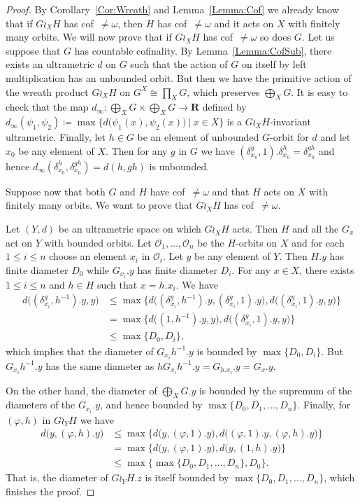 \documentclass[a4paper]{article}
\theoremstyle{definition}
\newcommand*{\field}[1]{\mathbf{#1}}
\newcommand*{\R}{\field{R}}
\newcommand{\setst}[2]{\{#1\ |\ #2\}}
\begin{document}
\begin{proof}
By Corollary~\ref{Cor:Wreath} and Lemma~\ref{Lemma:Cof} we already know that if $G \wr_X H$ has cof~$\neq\omega$, then $H$ has cof~$\neq\omega$ and it acts on $X$ with finitely many orbits.
We will now prove that if $G \wr_X H$ has cof~$\neq\omega$ so does $G$.
Let us suppose that $G$ has countable cofinality. By Lemma~\ref{Lemma:CofSub}, there exists an ultrametric $d$ on $G$ such that the action of $G$ on itself by left multiplication has an unbounded orbit.
But then we have the primitive action of the wreath product $G\wr_XH$ on $G^X\cong\prod_XG$, which preserves $\bigoplus_XG$.
It is easy to check that the map $d_\infty\colon\bigoplus_XG\times\bigoplus_XG\to\R$ defined by $d_\infty(\psi_1,\psi_2)\coloneqq\max\setst{d\bigl(\psi_1(x),\psi_2(x)\bigr)}{x\in X}$ is a $G\wr_XH$-invariant ultrametric.
Finally, let $h\in G$ be an element of unbounded $G$-orbit for $d$ and let $x_0$ be any element of $X$. Then for any $g$ in $G$ we have $(\delta_{x_0}^g,1).\delta_{x_0}^h=\delta_{x_0}^{gh}$ and hence $d_\infty(\delta_{x_0}^h,\delta_{x_0}^{gh})=d(h,gh)$ is unbounded.

Suppose now that both $G$ and $H$ have cof~$\neq\omega$ and that $H$ acts on $X$ with finitely many orbits. We want to prove that $G\wr_XH$ has cof~$\neq\omega$.

Let $(Y,d)$ be an ultrametric space on which $G\wr_XH$ acts.
Then $H$ and all the $G_x$ act on $Y$ with bounded orbits.
Let $\mathcal O_1,\dots,\mathcal O_n$ be the $H$-orbits on $X$ and for each $1\leq i\leq n$ choose an element $x_i$ in $\mathcal O_i$.
Let $y$ be any element of $Y$.
Then $H.y$ has finite diameter $D_0$ while $G_{x_i}.y$ has finite diameter $D_i$.
For any $x\in X$, there exists $1\leq i\leq n$ and $h\in H$ such that $x=h.x_i$.
We have
\begin{align*}
	d\bigl((\delta_{x_i}^g,h^{-1}).y,y\bigr)&\leq\max\{d\bigl((\delta_{x_i}^g,h^{-1}).y,(\delta_{x_i}^g,1).y\bigr),d\bigl((\delta_{x_i}^g,1).y,y\bigr)\}\\
	&=\max\{d\bigl((1,h^{-1}).y,y\bigr),d\bigl((\delta_{x_i}^g,1).y,y\bigr)\}\\
	&\leq \max\{D_0,D_i\},
\end{align*}
which implies that the diameter of $G_{x_i}h^{-1}.y$ is bounded by $\max\{D_0,D_i\}$.
But $G_{x_i}h^{-1}.y$ has the same diameter as $hG_{x_i}h^{-1}.y=G_{h.x_i}.y=G_x.y$.

On the other hand, the diameter of $\bigoplus_XG.y$ is bounded by the supremum of the diameters of the $G_{x_i}.y$, and hence bounded by $\max\{D_0,D_1,\dots,D_n\}$.
Finally, for $(\varphi,h)$ in $G\wr_YH$ we have
\begin{align*}
	d\bigl(y,(\varphi,h).y\bigr)&\leq\max\{d\bigl(y,(\varphi,1).y\bigr),d\bigl((\varphi,1).y,(\varphi,h).y\bigr)\}\\
	&=\max\{d\bigl(y,(\varphi,1).y\bigr),d\bigl(y,(1,h).y\bigr)\}\\
	&\leq\max\{\max\{D_0,D_1,\dots,D_n\},D_0\}.
\end{align*}
That is, the diameter of $G\wr_YH.z$ is itself bounded by $\max\{D_0,D_1,\dots,D_n\}$, which finishes the proof.
\end{proof}
\end{document}

